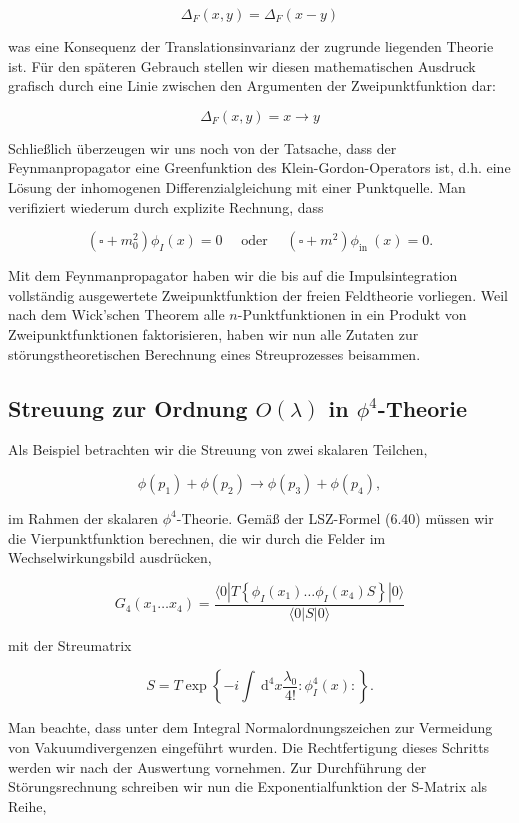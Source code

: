 \documentclass[10pt, letterpaper]{article}
\begin{document}
$$
\Delta_{F}(x, y)=\Delta_{F}(x-y)
$$

was eine Konsequenz der Translationsinvarianz der zugrunde liegenden Theorie ist. Für den späteren Gebrauch stellen wir diesen mathematischen Ausdruck grafisch durch eine Linie zwischen den Argumenten der Zweipunktfunktion dar:

$$
\Delta_{F}(x, y)=x \longrightarrow y
$$

Schließlich überzeugen wir uns noch von der Tatsache, dass der Feynmanpropagator eine Greenfunktion des Klein-Gordon-Operators ist, d.h. eine Lösung der inhomogenen Differenzialgleichung mit einer Punktquelle. Man verifiziert wiederum durch explizite Rechnung, dass

$$
\left(\square+m_{0}^{2}\right) \phi_{I}(x)=0 \quad \text { oder } \quad\left(\square+m^{2}\right) \phi_{\text {in }}(x)=0 .
$$

Mit dem Feynmanpropagator haben wir die bis auf die Impulsintegration vollständig ausgewertete Zweipunktfunktion der freien Feldtheorie vorliegen. Weil nach dem Wick'schen Theorem alle $n$-Punktfunktionen in ein Produkt von Zweipunktfunktionen faktorisieren, haben wir nun alle Zutaten zur störungstheoretischen Berechnung eines Streuprozesses beisammen.

\subsection*{Streuung zur Ordnung $O(\lambda)$ in $\phi^{4}$-Theorie}
Als Beispiel betrachten wir die Streuung von zwei skalaren Teilchen,

$$
\phi\left(p_{1}\right)+\phi\left(p_{2}\right) \longrightarrow \phi\left(p_{3}\right)+\phi\left(p_{4}\right),
$$

im Rahmen der skalaren $\phi^{4}$-Theorie. Gemäß der LSZ-Formel (6.40) müssen wir die Vierpunktfunktion berechnen, die wir durch die Felder im Wechselwirkungsbild ausdrücken,

$$
G_{4}\left(x_{1} \ldots x_{4}\right)=\frac{\langle 0| T\left\{\phi_{I}\left(x_{1}\right) \ldots \phi_{I}\left(x_{4}\right) S\right\}|0\rangle}{\langle 0| S|0\rangle}
$$

mit der Streumatrix

$$
S=T \exp \left\{-i \int \mathrm{~d}^{4} x \frac{\lambda_{0}}{4!}: \phi_{I}^{4}(x):\right\} .
$$

Man beachte, dass unter dem Integral Normalordnungszeichen zur Vermeidung von Vakuumdivergenzen eingeführt wurden. Die Rechtfertigung dieses Schritts werden wir nach der Auswertung vornehmen. Zur Durchführung der Störungsrechnung schreiben wir nun die Exponentialfunktion der S-Matrix als Reihe,
\end{document}
